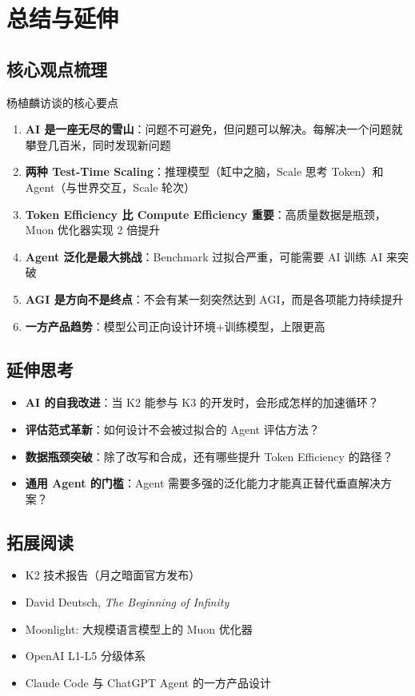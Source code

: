 \section{总结与延伸}

\subsection{核心观点梳理}

\begin{importantbox}{杨植麟访谈的核心要点}
\begin{enumerate}
    \item \textbf{AI 是一座无尽的雪山}：问题不可避免，但问题可以解决。每解决一个问题就攀登几百米，同时发现新问题
    \item \textbf{两种 Test-Time Scaling}：推理模型（缸中之脑，Scale 思考 Token）和 Agent（与世界交互，Scale 轮次）
    \item \textbf{Token Efficiency 比 Compute Efficiency 重要}：高质量数据是瓶颈，Muon 优化器实现 2 倍提升
    \item \textbf{Agent 泛化是最大挑战}：Benchmark 过拟合严重，可能需要 AI 训练 AI 来突破
    \item \textbf{AGI 是方向不是终点}：不会有某一刻突然达到 AGI，而是各项能力持续提升
    \item \textbf{一方产品趋势}：模型公司正向设计环境+训练模型，上限更高
\end{enumerate}
\end{importantbox}

\subsection{延伸思考}

\begin{itemize}
    \item \textbf{AI 的自我改进}：当 K2 能参与 K3 的开发时，会形成怎样的加速循环？
    \item \textbf{评估范式革新}：如何设计不会被过拟合的 Agent 评估方法？
    \item \textbf{数据瓶颈突破}：除了改写和合成，还有哪些提升 Token Efficiency 的路径？
    \item \textbf{通用 Agent 的门槛}：Agent 需要多强的泛化能力才能真正替代垂直解决方案？
\end{itemize}

\subsection{拓展阅读}

\begin{itemize}
    \item K2 技术报告（月之暗面官方发布）
    \item David Deutsch, \textit{The Beginning of Infinity}
    \item Moonlight: 大规模语言模型上的 Muon 优化器
    \item OpenAI L1-L5 分级体系
    \item Claude Code 与 ChatGPT Agent 的一方产品设计
\end{itemize}




